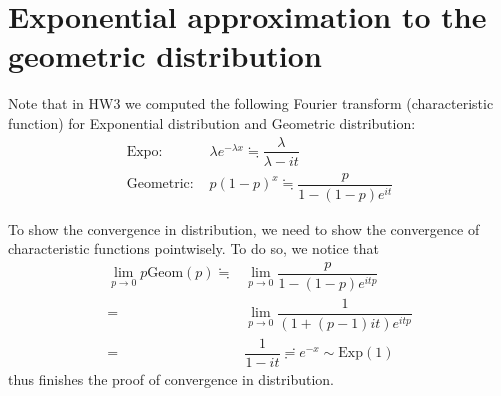 \documentclass[11pt,a4paper]{article}
\numberwithin{equation}{section}%
\begin{document}
\section{Exponential approximation to the geometric distribution}
Note that in HW3 we computed the following Fourier transform (characteristic function) for Exponential distribution and Geometric distribution:
\begin{align*}
    \text{Expo: }&\lambda e^{-\lambda x} \fallingdotseq \dfrac{ \lambda  }{ \lambda -it } \\
    \text{Geometric: }&p(1-p)^x \fallingdotseq \dfrac{ p }{ 1-(1-p)e^{it} } 
\end{align*}

To show the convergence in distribution, we need to show the convergence of characteristic functions pointwisely. To do so, we notice that
\begin{align*}
    \lim_{p\to 0} p\mathrm{ Geom }(p)\fallingdotseq &\lim_{p\to 0} \dfrac{ p }{ 1-(1-p)e^{itp} }  \\
    =& \lim_{p\to 0} \dfrac{ 1 }{ (1+(p-1)it)e^{itp} } \\
    =& \dfrac{ 1 }{ 1-it } \risingdotseq e^{-x} \sim \mathrm{ Exp }(1)  
\end{align*}
thus finishes the proof of convergence in distribution.
\end{document}
